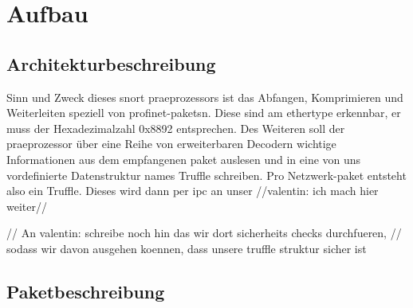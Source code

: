 \chapter{Aufbau \sppname}

\section{Architekturbeschreibung}

Sinn und Zweck dieses \gls{snort} \gls{praeprozessor}s \sppname ist das Abfangen,
Komprimieren und Weiterleiten speziell von \gls{profinet}-\glspl{paket}n. Diese
sind am \gls{ethertype} erkennbar, er muss der Hexadezimalzahl 0x8892 entsprechen.
Des Weiteren soll der \gls{praeprozessor} über eine Reihe von erweiterbaren
Decodern wichtige Informationen aus dem empfangenen \gls{paket} auslesen und in
eine von uns vordefinierte Datenstruktur names Truffle schreiben. Pro
Netzwerk-\gls{paket} entsteht also ein Truffle. Dieses wird dann per \gls{ipc}
an unser \programname //valentin: ich mach hier weiter//

// An valentin: schreibe noch hin das wir dort sicherheits checks durchfueren,
// sodass wir davon ausgehen koennen, dass unsere truffle struktur sicher ist

\section{Paketbeschreibung}
